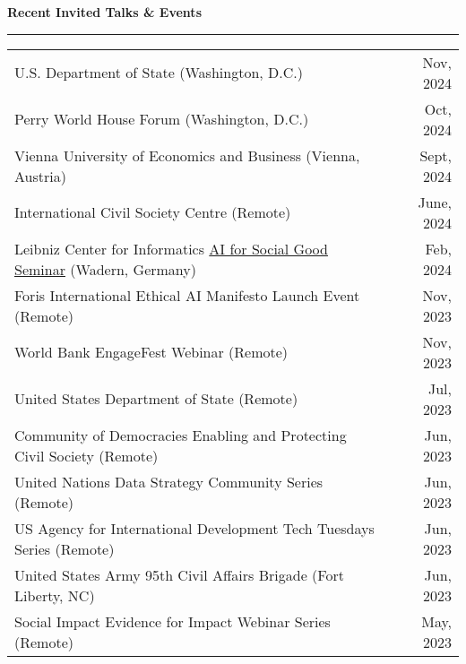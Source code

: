 \documentclass[11pt]{article}
\begin{document}
\textbf{\large Recent Invited Talks \& Events}\\
\rule[3mm]{\textwidth}{.2pt}
\noindent\begin{tabular*}{\textwidth}{@{}l@{\extracolsep{\fill}}r@{}}

U.S. Department of State (Washington, D.C.) & Nov, 2024\\

Perry World House Forum (Washington, D.C.) & Oct, 2024\\

Vienna University of Economics and Business (Vienna, Austria) & Sept, 2024\\

International Civil Society Centre (Remote) & June, 2024\\

Leibniz Center for Informatics \href{https://drops.dagstuhl.de/storage/04dagstuhl-reports/volume14/issue02/24082/DagRep.14.2.182/DagRep.14.2.182.pdf}{AI for Social Good Seminar} (Wadern, Germany) & Feb, 2024\\

Foris International Ethical AI Manifesto Launch Event (Remote) & Nov, 2023\\

World Bank EngageFest Webinar (Remote) & Nov, 2023\\

United States Department of State (Remote) & Jul, 2023\\

Community of Democracies Enabling and Protecting Civil Society (Remote) & Jun, 2023\\

United Nations Data Strategy Community Series (Remote) & Jun, 2023\\

US Agency for International Development Tech Tuesdays Series (Remote) & Jun, 2023\\

United States Army 95th Civil Affairs Brigade (Fort Liberty, NC) & Jun, 2023\\

Social Impact Evidence for Impact Webinar Series (Remote) & May, 2023\\

\end{tabular*}
\end{document}
